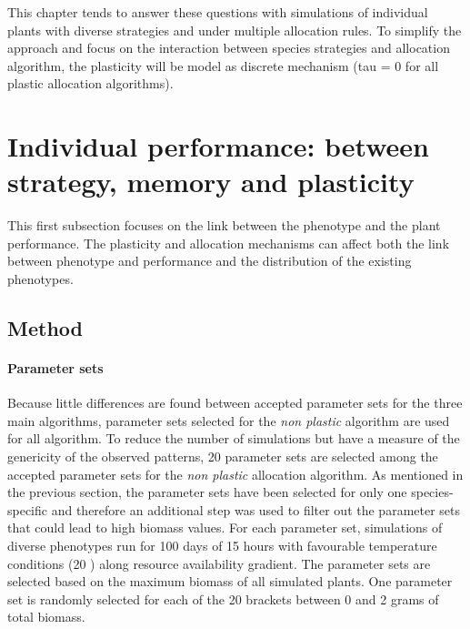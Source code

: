 This chapter tends to answer these questions with simulations of individual plants with diverse strategies and under multiple allocation rules. To simplify the approach and focus on the interaction between species strategies and allocation algorithm, the plasticity will be model as discrete mechanism (tau = 0 for all plastic allocation algorithms).

\section{Individual performance: between strategy, memory and plasticity}\label{section:landscape}

This first subsection focuses on the link between the phenotype and the plant performance. The plasticity and allocation mechanisms can affect both the link between phenotype and performance and the distribution of the existing phenotypes.



\subsection{Method}

\paragraph{Parameter sets}
Because little differences are found between accepted parameter sets for the three main algorithms, parameter sets selected for the \textit{non plastic} algorithm are used for all algorithm. To reduce the number of simulations but have a measure of the genericity of the observed patterns, 20 parameter sets are selected among the accepted parameter sets for the \textit{non plastic} allocation algorithm. As mentioned in the previous section, the parameter sets have been selected for only one species-specific and therefore an additional step was used to filter out the parameter sets that could lead to high biomass values. For each parameter set, simulations of diverse phenotypes run for 100 days of 15 hours with favourable temperature conditions (20 \celsius) along resource availability gradient. The parameter sets are selected based on the maximum biomass of all simulated plants. One parameter set is randomly selected for each of the 20 brackets between 0 and 2 grams of total biomass.

